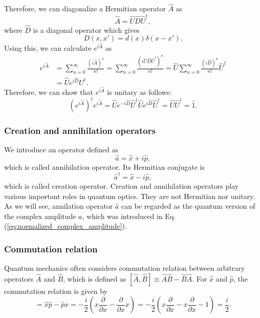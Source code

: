 \documentclass{book}
\begin{document}
Therefore, we can diagonalize a Hermitian operator $\hat A$ as
\begin{equation}
  \hat A = \hat U\hat D\hat U^\dagger,
\end{equation}
where $\hat D$ is a diagonal operator which gives
\begin{equation}
  D(x,x') = d(x)\delta(x-x').
\end{equation}
Using this, we can calculate $e^{i\hat A}$ as 
\begin{equation}
\begin{aligned}
  e^{i\hat A} &= \sum_{n=0}^{\infty}\frac{\left(i\hat A\right)^n}{n!} 
  = \sum_{n=0}^{\infty}\frac{\left(i\hat U\hat D\hat U^\dagger\right)^n}{n!} = \hat U\sum_{n=0}^{\infty}\frac {(i\hat D)^n} {n!}\hat U^\dagger\\
  &= \hat U e^{i\hat D}U^\dagger.
\end{aligned}
\end{equation}
Therefore, we can show that $e^{i\hat A}$ is unitary as follows:
\begin{equation}
\left(e^{i\hat A}\right)^\dagger e^{i\hat A} = \hat U e^{-i\hat D}\hat U^\dagger \hat U e^{i\hat D}\hat U^\dagger = \hat U \hat U^\dagger = \hat 1.
\end{equation}

\subsubsection{Creation and annihilation operators}
We introduce an operator defined as
\begin{equation}
  \hat a = \hat x + i\hat p,
\end{equation}
which is called annihilation operator.
Its Hermitian conjugate is 
\begin{equation}
  \hat a^\dagger = \hat x - i\hat p,
\end{equation}
which is called creation operator.
Creation and annihilation operators play various important roles in quantum optics. They are not Hermitian nor unitary. As we will see, annilation operator $\hat a$ can be regarded as the quantum version of the complex amplitude $a$, which was introduced in Eq. (\ref{eq:normalized_complex_amplitude}).

\subsubsection{Commutation relation}
Quantum mechanics often considers commutation relation between arbitrary operators $\hat A$ and $\hat B$, which is defined as $[\hat A, \hat B]\equiv \hat A\hat B - \hat B \hat A$. For $\hat x$ and $\hat p$, the commutation relation is given by 
\begin{equation}
  [\hat x, \hat p] = \hat x\hat p- \hat p \hat x = -\frac{i}{2}\left(x\frac{\partial}{\partial x} -  \frac{\partial}{\partial x}x\right) = -\frac{i}{2}\left(x\frac{\partial}{\partial x} -  x\frac{\partial}{\partial x} - 1\right) = \frac i 2.
  \label{eq:commutation_x_p}
\end{equation}
\end{document}
